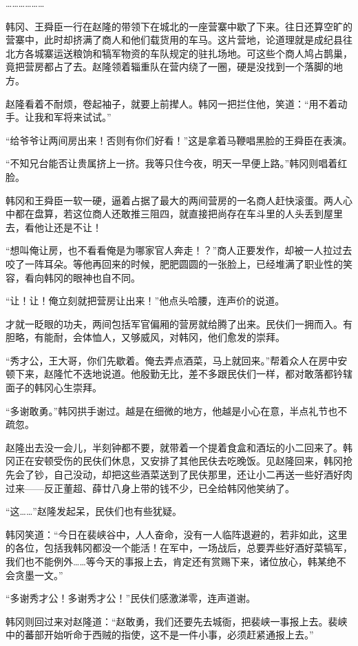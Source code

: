 ………………

韩冈、王舜臣一行在赵隆的带领下在城北的一座营寨中歇了下来。往日还算空旷的营寨中，此时却挤满了商人和他们载货用的车马。这片营地，论道理就是成纪县往北方各城寨运送粮饷和犒军物资的车队规定的驻扎场地。可这些个商人鸠占鹊巢，竟把营房都占了去。赵隆领着辎重队在营内绕了一圈，硬是没找到一个落脚的地方。

赵隆看着不耐烦，卷起袖子，就要上前撵人。韩冈一把拦住他，笑道：“用不着动手。让我和军将来试试。”

“给爷爷让两间房出来！否则有你们好看！”这是拿着马鞭唱黑脸的王舜臣在表演。

“不知兄台能否让贵属挤上一挤。我等只住今夜，明天一早便上路。”韩冈则唱着红脸。

韩冈和王舜臣一软一硬，逼着占据了最大的两间营房的一名商人赶快滚蛋。两人心中都在盘算，若这位商人还敢推三阻四，就直接把尚存在车斗里的人头丢到屋里去，看他让还是不让！

“想叫俺让房，也不看看俺是为哪家官人奔走！？”商人正要发作，却被一人拉过去咬了一阵耳朵。等他再回来的时候，肥肥圆圆的一张脸上，已经堆满了职业性的笑容，看向韩冈的眼神也自不同。

“让！让！俺立刻就把营房让出来！”他点头哈腰，连声价的说道。

才就一眨眼的功夫，两间包括军官偏厢的营房就给腾了出来。民伕们一拥而入。有胆略，有能耐，会体恤人，又够威风，对韩冈，他们愈发的崇拜。

“秀才公，王大哥，你们先歇着。俺去弄点酒菜，马上就回来。”帮着众人在房中安顿下来，赵隆忙不迭地说道。他殷勤无比，差不多跟民伕们一样，都对敢落都钤辖面子的韩冈心生崇拜。

“多谢敢勇。”韩冈拱手谢过。越是在细微的地方，他越是小心在意，半点礼节也不疏忽。

赵隆出去没一会儿，半刻钟都不要，就带着一个提着食盒和酒坛的小二回来了。韩冈正在安顿受伤的民伕们休息，又安排了其他民伕去吃晚饭。见赵隆回来，韩冈抢先会了钞，自己没动，却把这些酒菜送到了民伕那里，还让小二再送一些好酒好肉过来——反正董超、薛廿八身上带的钱不少，已全给韩冈他笑纳了。

“这……”赵隆发起呆，民伕们也有些犹疑。

韩冈笑道：“今日在裴峡谷中，人人奋命，没有一人临阵退避的，若非如此，这里的各位，包括我韩冈都没一个能活！在军中，一场战后，总要弄些好酒好菜犒军，我们也不能例外……等今天的事报上去，肯定还有赏赐下来，诸位放心，韩某绝不会贪墨一文。”

“多谢秀才公！多谢秀才公！”民伕们感激涕零，连声道谢。

韩冈则回过来对赵隆道：“赵敢勇，我们还要先去城衙，把裴峡一事报上去。裴峡中的蕃部开始听命于西贼的指使，这不是一件小事，必须赶紧通报上去。”

